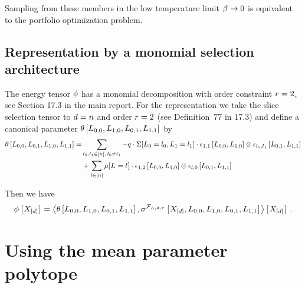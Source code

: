 \documentclass[aps,onecolumn,nofootinbib,pra]{article}
\begin{document}
    Sampling from these members in the low temperature limit $\beta\rightarrow 0$ is equivalent to the portfolio optimization problem.

    \subsection{Representation by a monomial selection architecture}

    The energy tensor $\phi$ has a monomial decomposition with order constraint $r=2$, see Section 17.3 in the main report.
    For the representation we take the slice selection tensor to $d=n$ and order $r=2$ (see Definition~77 in 17.3) and define a canonical parameter $\theta\left[L_{0,0},L_{1,0},L_{0,1},L_{1,1}\right]$ by
    \begin{align*}
        \theta\left[L_{0,0},L_{0,1},L_{1,0},L_{1,1}\right]
        = & \sum_{l_{0},l_{1}\in[n], \, l_{0}\neq l_{1}}
        -q \cdot \Sigma[L_{0}=l_{0},L_{1}=l_{1}]  \cdot \epsilon_{1,1}\left[L_{0,0},L_{1,0}\right] \otimes \epsilon_{l_{0},l_{1}}\left[L_{0,1},L_{1,1}\right]\\
        & + \sum_{l\in[n]}  \mu[L_{}=l_{}] \cdot  \epsilon_{1,2}\left[L_{0,0},L_{1,0}\right] \otimes \epsilon_{l,0}\left[L_{0,1},L_{1,1}\right]
    \end{align*}


    Then we have
    \begin{align*}
        \phi\left[X_{[d]}\right]
        = \left\langle \theta\left[L_{0,0},L_{1,0},L_{0,1},L_{1,1}\right],\sigma^{\mathcal{F}_{\land,d,r}}\left[X_{[d]},L_{0,0},L_{1,0},L_{0,1},L_{1,1}\right]\right\rangle \left[ X_{[d]} \right] \, .
    \end{align*}


    \section{Using the mean parameter polytope}
\end{document}
